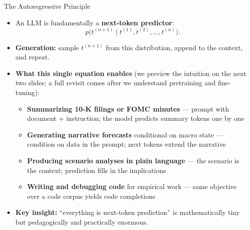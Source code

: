 \begin{frame}{The Autoregressive Principle}
\begin{itemize}
\item An LLM is fundamentally a \textbf{next-token predictor}:
\[
   p\bigl(t^{(n+1)} \mid t^{(1)}, t^{(2)}, \ldots, t^{(n)}\bigr).
\]

\medskip
\item \textbf{Generation:} sample $t^{(n+1)}$ from this distribution, append to the context, and repeat.

\medskip
\item \textbf{What this single equation enables} (we preview the intuition on the next two slides; a full revisit comes after we understand pretraining and fine-tuning):
\begin{itemize}
    \item \textbf{Summarizing 10-K filings or FOMC minutes} --- prompt with document + instruction; the model predicts summary tokens one by one
    \item \textbf{Generating narrative forecasts} conditional on macro state --- condition on data in the prompt; next tokens extend the narrative
    \item \textbf{Producing scenario analyses in plain language} --- the scenario is the context; prediction fills in the implications
    \item \textbf{Writing and debugging code} for empirical work --- same objective over a code corpus yields code completions
\end{itemize}

\medskip
\item \textbf{Key insight:} ``everything is next-token prediction'' is mathematically tiny but pedagogically and practically enormous.
\end{itemize}
\end{frame}

